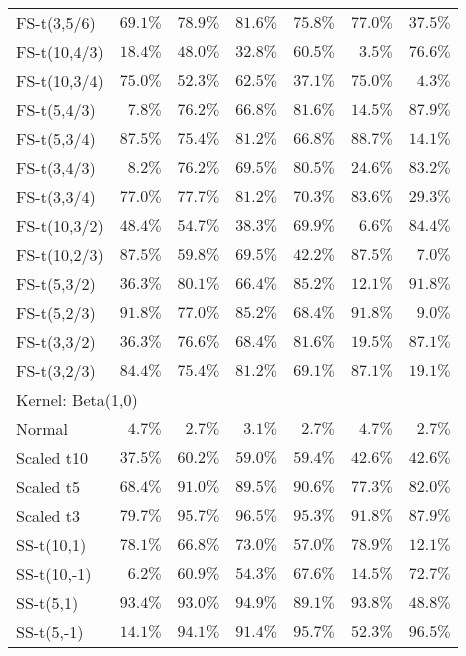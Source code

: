 \begin{longtable}{lrrrrrr}
FS-t(3,5/6) & $69.1\%$ & $78.9\%$ & $81.6\%$ & $75.8\%$ & $77.0\%$ & $37.5\%$ \\ 
FS-t(10,4/3) & $18.4\%$ & $48.0\%$ & $32.8\%$ & $60.5\%$ & $3.5\%$ & $76.6\%$ \\ 
FS-t(10,3/4) & $75.0\%$ & $52.3\%$ & $62.5\%$ & $37.1\%$ & $75.0\%$ & $4.3\%$ \\ 
FS-t(5,4/3) & $7.8\%$ & $76.2\%$ & $66.8\%$ & $81.6\%$ & $14.5\%$ & $87.9\%$ \\ 
FS-t(5,3/4) & $87.5\%$ & $75.4\%$ & $81.2\%$ & $66.8\%$ & $88.7\%$ & $14.1\%$ \\ 
FS-t(3,4/3) & $8.2\%$ & $76.2\%$ & $69.5\%$ & $80.5\%$ & $24.6\%$ & $83.2\%$ \\ 
FS-t(3,3/4) & $77.0\%$ & $77.7\%$ & $81.2\%$ & $70.3\%$ & $83.6\%$ & $29.3\%$ \\ 
FS-t(10,3/2) & $48.4\%$ & $54.7\%$ & $38.3\%$ & $69.9\%$ & $6.6\%$ & $84.4\%$ \\ 
FS-t(10,2/3) & $87.5\%$ & $59.8\%$ & $69.5\%$ & $42.2\%$ & $87.5\%$ & $7.0\%$ \\ 
FS-t(5,3/2) & $36.3\%$ & $80.1\%$ & $66.4\%$ & $85.2\%$ & $12.1\%$ & $91.8\%$ \\ 
FS-t(5,2/3) & $91.8\%$ & $77.0\%$ & $85.2\%$ & $68.4\%$ & $91.8\%$ & $9.0\%$ \\ 
FS-t(3,3/2) & $36.3\%$ & $76.6\%$ & $68.4\%$ & $81.6\%$ & $19.5\%$ & $87.1\%$ \\ 
FS-t(3,2/3) & $84.4\%$ & $75.4\%$ & $81.2\%$ & $69.1\%$ & $87.1\%$ & $19.1\%$ \\ 
\midrule
\multicolumn{7}{l}{Kernel: Beta(1,0)} \\ 
\midrule
Normal & $4.7\%$ & $2.7\%$ & $3.1\%$ & $2.7\%$ & $4.7\%$ & $2.7\%$ \\ 
Scaled t10 & $37.5\%$ & $60.2\%$ & $59.0\%$ & $59.4\%$ & $42.6\%$ & $42.6\%$ \\ 
Scaled t5 & $68.4\%$ & $91.0\%$ & $89.5\%$ & $90.6\%$ & $77.3\%$ & $82.0\%$ \\ 
Scaled t3 & $79.7\%$ & $95.7\%$ & $96.5\%$ & $95.3\%$ & $91.8\%$ & $87.9\%$ \\ 
SS-t(10,1) & $78.1\%$ & $66.8\%$ & $73.0\%$ & $57.0\%$ & $78.9\%$ & $12.1\%$ \\ 
SS-t(10,-1) & $6.2\%$ & $60.9\%$ & $54.3\%$ & $67.6\%$ & $14.5\%$ & $72.7\%$ \\ 
SS-t(5,1) & $93.4\%$ & $93.0\%$ & $94.9\%$ & $89.1\%$ & $93.8\%$ & $48.8\%$ \\ 
SS-t(5,-1) & $14.1\%$ & $94.1\%$ & $91.4\%$ & $95.7\%$ & $52.3\%$ & $96.5\%$ \\ 

\end{longtable}
